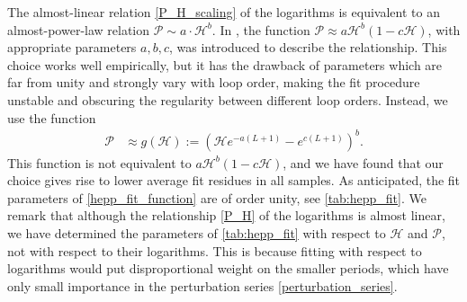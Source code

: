 \documentclass[12pt,a4paper]{article}
\newcommand{\period}{\mathcal P}
\renewcommand{\|}{\rule[-0.4ex]{0.2ex}{1.2em}}
\begin{document}
The almost-linear relation \cref{P_H_scaling} of the logarithms is equivalent to an almost-power-law relation $\period \sim a \cdot \mathcal H^b$. In  \cite{kompaniets_minimally_2017}, the function $\period \approx a \mathcal H^b (1-c\mathcal H )$, with appropriate parameters $a,b,c$, was introduced to describe the relationship. This choice works well empirically, but it has the drawback of parameters which are far from unity and strongly vary with loop order, making the fit procedure unstable and obscuring the regularity  between different loop orders. Instead, we use the function
\begin{align}\label{hepp_fit_function}
\period &\approx g(\mathcal H) := \left( \mathcal H e^{-a(L+1)} - e^{c(L+1)} \right) ^b.
\end{align}
This function is not equivalent to $a \mathcal H^b (1-c\mathcal H )$, and we have found that our choice gives rise to lower average fit residues in all  samples.  As anticipated, the fit parameters of \cref{hepp_fit_function} are of order unity, see \cref{tab:hepp_fit}. 
We remark that although the relationship \cref{P_H} of the logarithms is almost linear, we have determined the parameters of \cref{tab:hepp_fit} with respect to $\mathcal H$ and $\period$, not with respect to their logarithms. This is because fitting with respect to logarithms would put disproportional weight on the smaller periods, which have only small importance in the perturbation series \cref{perturbation_series}.
\end{document}
